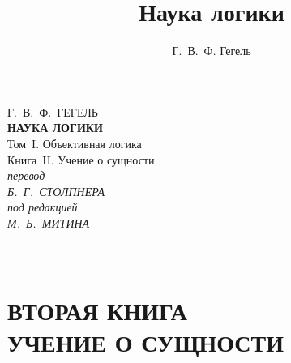 \documentclass[b5paper, 11pt, twoside, onecolumn, openany]{memoir}
\author{Г.~В.~Ф. Гегель}
\title{Наука логики}
\date{}
\begin{document}
\frontmatter
\pagestyle{empty}

{\centering
  {\Large Г.~В.~Ф.~ГЕГЕЛЬ} \\
  \vspace{130pt}
  \textbf{\Huge НАУКА ЛОГИКИ} \\
  \vspace{60pt}
  {\Large Том~I. Объективная логика} \\
  \vspace{8pt}
  {\large Книга~II. Учение о сущности} \\
  \vspace{70pt}
  \textit{перевод} \\
  \textit{Б.~Г.~СТОЛПНЕРА} \\
  \vspace{10pt}
  \textit{под редакцией} \\
  \textit{М.~Б.~МИТИНА}
\par}

\clearpage

\mainmatter
\pagestyle{plain}


\part[\hspace{38mm}УЧЕНИЕ О СУЩНОСТИ]%
     {\ \\\vspace{200pt}\Large\mdseries ВТОРАЯ КНИГА \\
      \LARGE\bfseries УЧЕНИЕ О СУЩНОСТИ}
\thispagestyle{empty}
\clearpage







\end{document}

